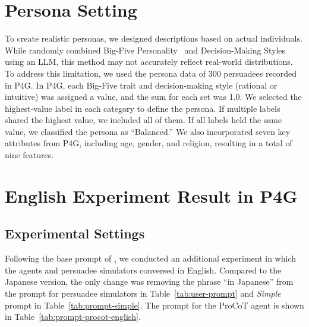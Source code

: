 \documentclass[11pt]{article}
\begin{document}
\section{Persona Setting}
\label{sec:persona-setting}
To create realistic personas, we designed descriptions based on actual individuals.
While \citet{zhang-etal-2024-strength} randomly combined Big-Five Personality~\citep{big-five} and Decision-Making Styles~\citep{decision-making} using an LLM, this method may not accurately reflect real-world distributions. 
To address this limitation, we used the persona data of 300 persuadees recorded in P4G.
In P4G, each Big-Five trait and decision-making style (rational or intuitive) was assigned a value, and the sum for each set was 1.0. 
We selected the highest-value label in each category to define the persona. 
If multiple labels shared the highest value, we included all of them. 
If all labels held the same value, we classified the persona as ``Balanced.'' 
We also incorporated seven key attributes from P4G, including age, gender, and religion, resulting in a total of nine features.

\section{English Experiment Result in P4G}
\label{sec:en-result}
\subsection{Experimental Settings}
Following the base prompt of \citet{zhang-etal-2024-strength}, we conducted an additional experiment in which the agents and persuadee simulators conversed in English. 
Compared to the Japanese version, the only change was removing the phrase ``in Japanese'' from the prompt for persuadee simulators in Table~\ref{tab:user-prompt} and \textit{Simple} prompt in Table~\ref{tab:prompt-simple}. 
The prompt for the ProCoT agent is shown in Table~\ref{tab:prompt-procot-english}.

\end{document}
